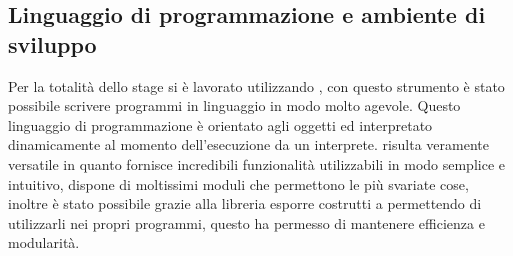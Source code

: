 \subsection{Linguaggio di programmazione e ambiente di sviluppo}
Per la totalità dello stage si è lavorato utilizzando , con questo strumento è stato possibile scrivere programmi in linguaggio  in modo molto agevole. Questo linguaggio di programmazione è orientato agli oggetti ed interpretato dinamicamente al momento dell'esecuzione da un interprete.  risulta veramente versatile in quanto fornisce incredibili funzionalità utilizzabili in modo semplice e intuitivo, dispone di moltissimi moduli che permettono le più svariate cose, inoltre è stato possibile grazie alla libreria  esporre costrutti  a  permettendo di utilizzarli nei propri programmi, questo ha permesso di mantenere efficienza e modularità.
	
